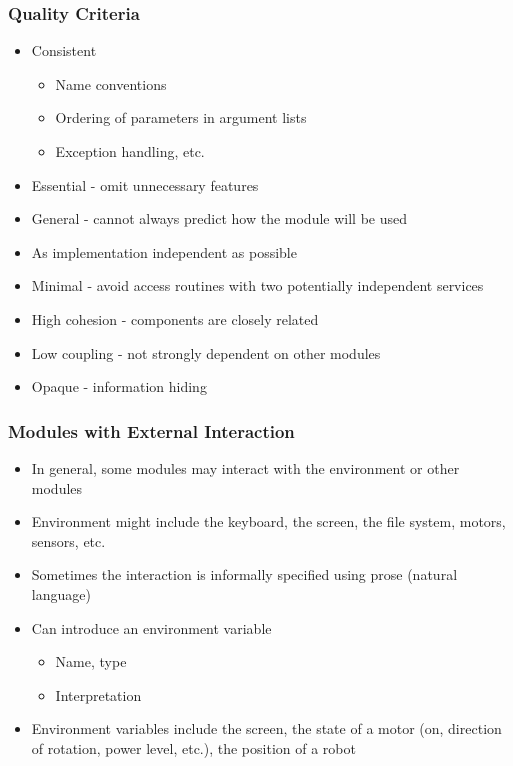 \documentclass[t,12pt,numbers,fleqn,handout]{beamer}
\begin{document}
\begin{frame}

\frametitle{Quality Criteria}

\begin{itemize}
\item Consistent
\begin{itemize}
\item Name conventions
\item Ordering of parameters in argument lists
\item Exception handling, etc.
\end{itemize}
\item Essential - omit unnecessary features
\item General - cannot always predict how the module will be used
\item As implementation independent as possible
\item Minimal - avoid access routines with two potentially independent services
\item High cohesion - components are closely related
\item Low coupling - not strongly dependent on other modules
\item Opaque - information hiding
\end{itemize}

\end{frame}


\begin{frame}
\frametitle{Modules with External Interaction}

\begin{itemize}
\item In general, some modules may interact with the environment or other modules
\item Environment might include the keyboard, the screen, the file system, motors, sensors, etc.
\item Sometimes the interaction is informally specified using prose (natural language)
\item Can introduce an environment variable
\begin{itemize}
\item Name, type
\item Interpretation
\end{itemize}
\item Environment variables include the screen, the state of a motor (on, direction of rotation, power level, etc.),
the position of a robot

\end{itemize}

\end{frame}
\end{document}
